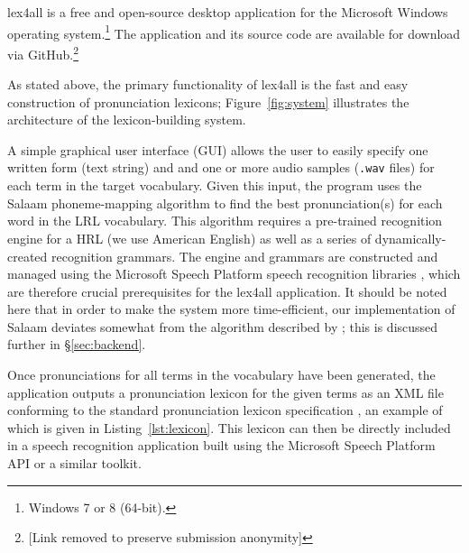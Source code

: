 \documentclass[11pt]{article}
\begin{document}
lex4all is a free and open-source desktop application for the Microsoft Windows operating system.\footnote{Windows 7 or 8 (64-bit).}  The application and its source code are available for download via GitHub.\footnote{[Link removed to preserve submission anonymity]}

As stated above, the primary functionality of lex4all is the fast and easy construction of pronunciation lexicons; Figure~\ref{fig:system} illustrates the architecture of the lexicon-building system.

A simple graphical user interface (GUI) allows the user to easily specify one written form (text string) and and one or more audio samples (\texttt{.wav} files) for each term in the target vocabulary.
Given this input, the program uses the Salaam phoneme-mapping algorithm \cite{Qiao10,Chan12} to find the best pronunciation(s) for each word in the LRL vocabulary. This algorithm requires a pre-trained recognition engine for a HRL (we use American English) as well as a series of dynamically-created recognition grammars. The engine and grammars are constructed and managed using the Microsoft Speech Platform speech recognition libraries \cite{mspsdk}, which are therefore crucial prerequisites for the lex4all application. It should be noted here that in order to make the system more time-efficient, our implementation of Salaam deviates somewhat from the algorithm described by ; this is discussed further in \S\ref{sec:backend}. 

Once pronunciations for all terms in the vocabulary have been generated, the application outputs a pronunciation lexicon for the given terms as an XML file conforming to the standard pronunciation lexicon specification \cite{pls}, an example of which is given in Listing~\ref{lst:lexicon}. This lexicon can then be directly included in a speech recognition application built using the Microsoft Speech Platform API or a similar toolkit.




\end{document}
